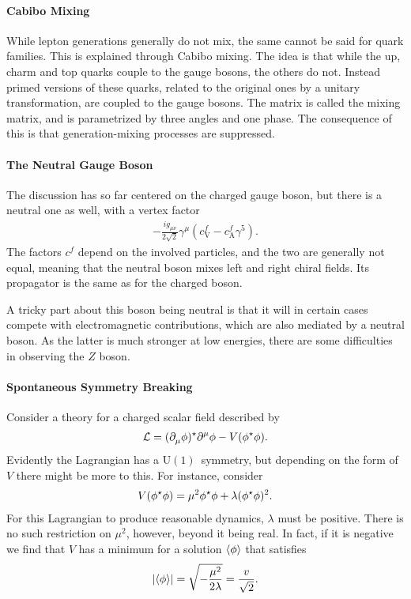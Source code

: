 \paragraph{Cabibo Mixing}
While lepton generations generally do not mix, the same cannot be said for quark families. This is explained through Cabibo mixing. The idea is that while the up, charm and top quarks couple to the gauge bosons, the others do not. Instead primed versions of these quarks, related to the original ones by a unitary transformation, are coupled to the gauge bosons. The matrix is called the mixing matrix, and is parametrized by three angles and one phase. The consequence of this is that generation-mixing processes are suppressed.

\paragraph{The Neutral Gauge Boson}
The discussion has so far centered on the charged gauge boson, but there is a neutral one as well, with a vertex factor
\begin{align*}
	-\frac{ig_{\mu\nu}}{2\sqrt{2}}\gamma^{\mu}(c_{\text{V}}^{f} - c_{\text{A}}^{f}\gamma^{5}).
\end{align*}
The factors $c^{f}$ depend on the involved particles, and the two are generally not equal, meaning that the neutral boson mixes left and right chiral fields. Its propagator is the same as for the charged boson.

A tricky part about this boson being neutral is that it will in certain cases compete with electromagnetic contributions, which are also mediated by a neutral boson. As the latter is much stronger at low energies, there are some difficulties in observing the $Z$ boson.

\paragraph{Spontaneous Symmetry Breaking}
Consider a theory for a charged scalar field described by
\begin{align*}
	\mathcal{L} = (\partial^{}_{\mu}\phi)^{\star}\partial^{\mu}_{}\phi - V(\phi^{\star}\phi).
\end{align*}
Evidently the Lagrangian has a $\text{U}(1)$ symmetry, but depending on the form of $V$ there might be more to this. For instance, consider
\begin{align*}
	V(\phi^{\star}\phi) = \mu^{2}\phi^{\star}\phi + \lambda(\phi^{\star}\phi)^{2}.
\end{align*}
For this Lagrangian to produce reasonable dynamics, $\lambda$ must be positive. There is no such restriction on $\mu^{2}$, however, beyond it being real. In fact, if it is negative we find that $V$ has a minimum for a solution $\expval{\phi}$ that satisfies
\begin{align*}
	\abs{\expval{\phi}} = \sqrt{-\frac{\mu^{2}}{2\lambda}} = \frac{v}{\sqrt{2}}.
\end{align*}

